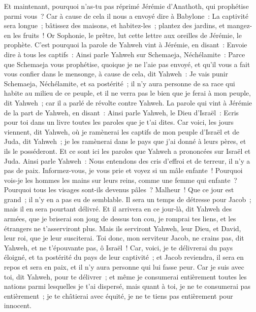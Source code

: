 \begin{multicols}{2}
Et maintenant, pourquoi n'as-tu pas réprimé Jérémie d'Anathoth, qui prophétise parmi vous~?
Car à cause de cela il nous a envoyé dire à Babylone~: La captivité sera longue~; bâtissez des maisons, et habitez-les~; plantez des jardins, et mangez-en les fruits~!
Or Sophonie, le prêtre, lut cette lettre aux oreilles de Jérémie, le prophète.
C'est pourquoi la parole de Yahweh vint à Jérémie, en disant~:
Envoie dire à tous les captifs~: Ainsi parle Yahweh sur Schemaeja, Néchélamite~: Parce que Schemaeja vous prophétise, quoique je ne l'aie pas envoyé, et qu'il vous a fait vous confier dans le mensonge,
à cause de cela, dit Yahweh~: Je vais punir Schemaeja, Néchélamite, et sa postérité~; il n'y aura personne de sa race qui habite au milieu de ce peuple, et il ne verra pas le bien que je ferai à mon peuple, dit Yahweh~; car il a parlé de révolte contre Yahweh.
\VerseOne{}La parole qui vint à Jérémie de la part de Yahweh, en disant~:
Ainsi parle Yahweh, le Dieu d'Israël~: Ecris pour toi dans un livre toutes les paroles que je t'ai dites.
Car voici, les jours viennent, dit Yahweh, où je ramènerai les captifs de mon peuple d'Israël et de Juda, dit Yahweh~; je les ramènerai dans le pays que j'ai donné à leurs pères, et ils le posséderont.
Et ce sont ici les paroles que Yahweh a prononcées sur Israël et Juda.
Ainsi parle Yahweh~: Nous entendons des cris d'effroi et de terreur, il n'y a pas de paix.
Informez-vous, je vous prie et voyez si un mâle enfante~! Pourquoi vois-je les hommes les mains sur leurs reins, comme une femme qui enfante~? Pourquoi tous les visages sont-ils devenus pâles~?
Malheur~! Que ce jour est grand~; il n'y en a pas eu de semblable. Il sera un temps de détresse pour Jacob~; mais il en sera pourtant délivré.
Et il arrivera en ce jour-là, dit Yahweh des armées, que je briserai son joug de dessus ton cou, je romprai tes liens, et les étrangers ne t'asserviront plus.
Mais ils serviront Yahweh, leur Dieu, et David, leur roi, que je leur susciterai.
Toi donc, mon serviteur Jacob, ne crains pas, dit Yahweh, et ne t'épouvante pas, ô Israël~! Car, voici, je te délivrerai du pays éloigné, et ta postérité du pays de leur captivité~; et Jacob reviendra, il sera en repos et sera en paix, et il n'y aura personne qui lui fasse peur.
Car je suis avec toi, dit Yahweh, pour te délivrer~; et même je consumerai entièrement toutes les nations parmi lesquelles je t'ai dispersé, mais quant à toi, je ne te consumerai pas entièrement~; je te châtierai avec équité, je ne te tiens pas entièrement pour innocent.

\end{multicols}

